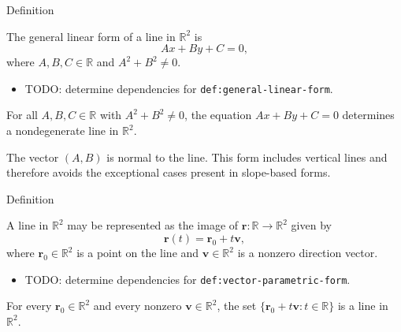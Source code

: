 \begin{definitionbox}{Definition}
\begin{definition}
\label{def:general-linear-form}
The general linear form of a line in $\mathbb{R}^2$ is
\[
  Ax+By+C=0,
\]
where $A,B,C\in\mathbb{R}$ and $A^2+B^2\neq 0$.
\end{definition}
\end{definitionbox}

\begin{dependencies}
\begin{itemize}
  \item TODO: determine dependencies for \texttt{def:general-linear-form}.
\end{itemize}
\end{dependencies}

\begin{remark*}
For all $A,B,C\in\mathbb{R}$ with $A^2+B^2\neq 0$, the equation
$Ax+By+C=0$ determines a nondegenerate line in $\mathbb{R}^2$.
\end{remark*}

\begin{remark*}[Interpretation]
The vector $(A,B)$ is normal to the line. This form includes vertical lines
and therefore avoids the exceptional cases present in slope-based forms.
\end{remark*}

\begin{definitionbox}{Definition}
\begin{definition}
\label{def:vector-parametric-form}
A line in $\mathbb{R}^2$ may be represented as the image of
$\mathbf r:\mathbb{R}\to\mathbb{R}^2$ given by
\[
  \mathbf r(t)=\mathbf r_0+t\mathbf v,
\]
where $\mathbf r_0\in\mathbb{R}^2$ is a point on the line and
$\mathbf v\in\mathbb{R}^2$ is a nonzero direction vector.
\end{definition}
\end{definitionbox}

\begin{dependencies}
\begin{itemize}
  \item TODO: determine dependencies for \texttt{def:vector-parametric-form}.
\end{itemize}
\end{dependencies}

\begin{remark*}
For every $\mathbf r_0\in\mathbb{R}^2$ and every nonzero
$\mathbf v\in\mathbb{R}^2$, the set
$\{\mathbf r_0+t\mathbf v:t\in\mathbb{R}\}$ is a line in $\mathbb{R}^2$.
\end{remark*}

